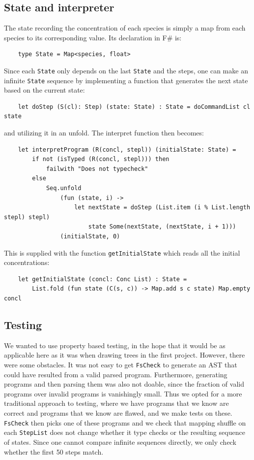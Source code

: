 \subsection{State and interpreter}
The state recording the concentration of each species is simply a map from each species to its corresponding value. Its declaration in F\# is:
\begin{verbatim}
    type State = Map<species, float>
\end{verbatim}
Since each \texttt{State} only depends on the last \texttt{State} and the steps, one can make an infinite \texttt{State} sequence by implementing a function that generates the next state based on the current state:
\begin{verbatim}
    let doStep (S(cl): Step) (state: State) : State = doCommandList cl state
\end{verbatim}
and utilizing it in an unfold. The interpret function then becomes:
\begin{verbatim}
    let interpretProgram (R(concl, stepl)) (initialState: State) =
        if not (isTyped (R(concl, stepl))) then
            failwith "Does not typecheck"
        else
            Seq.unfold
                (fun (state, i) ->
                    let nextState = doStep (List.item (i % List.length stepl) stepl)
                        state Some(nextState, (nextState, i + 1)))
                (initialState, 0)
\end{verbatim}

This is supplied with the function \texttt{getInitialState} which reads all the initial concentrations:
\begin{verbatim}
    let getInitialState (concl: Conc List) : State =
        List.fold (fun state (C(s, c)) -> Map.add s c state) Map.empty concl
\end{verbatim}


\subsection{Testing}
We wanted to use property based testing, in the hope that it would be as applicable here as it was when drawing trees in the first project. However, there were some obstacles. It was not easy to get \texttt{FsCheck} to generate an AST that could have resulted from a valid parsed program. Furthermore, generating programs and then parsing them was also not doable, since the fraction of valid programs over invalid programs is vanishingly small. Thus we opted for a more traditional approach to testing, where we have programs that we know are correct and programs that we know are flawed, and we make tests on these. \texttt{FsCheck} then picks one of these programs and we check that mapping shuffle on each \texttt{StepList} does not change whether it type checks or the resulting sequence of states. Since one cannot compare infinite sequences directly, we only check whether the first 50 steps match.

